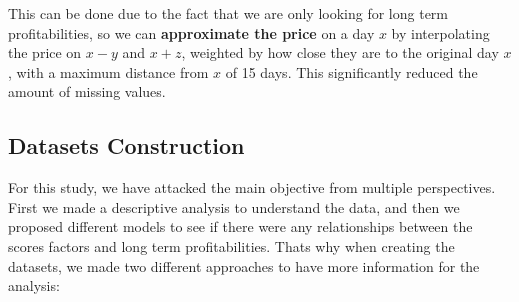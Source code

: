\documentclass[11pt,english,a4paper,hidelinks]{book}
\begin{document}
\noindent This can be done due to the fact that we are only looking for long term profitabilities, so we can \textbf{approximate the price} on a day $x$ by interpolating the price on $x-y$ and $x+z$, weighted by how close they are to the original day $x$, with a maximum distance from $x$ of 15 days. This significantly reduced the amount of missing values.

\subsection{Datasets Construction}

For this study, we have attacked the main objective from multiple perspectives. First we made a descriptive analysis to understand the data, and then we proposed different models to see if there were any relationships between the scores factors and long term profitabilities. Thats why when creating the datasets, we made two different approaches to have more information for the analysis:
\end{document}
